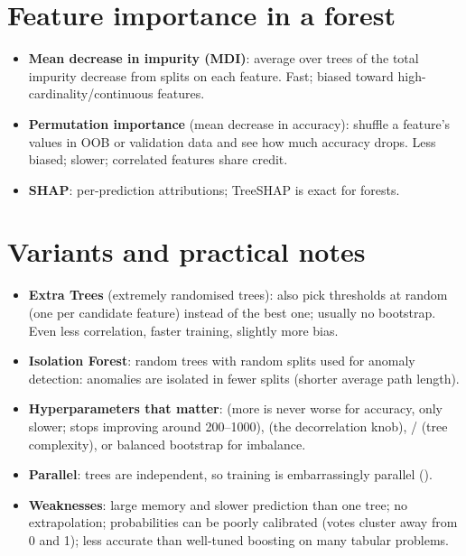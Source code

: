 \section{Feature importance in a forest}
\begin{itemize}
\item \textbf{Mean decrease in impurity (MDI)}: average over trees of the total impurity decrease from splits on each feature.
  Fast; biased toward high-cardinality/continuous features.
\item \textbf{Permutation importance} (mean decrease in accuracy): shuffle a feature's values in OOB or validation data and see how
  much accuracy drops. Less biased; slower; correlated features share credit.
\item \textbf{SHAP}: per-prediction attributions; TreeSHAP is exact for forests.
\end{itemize}

\section{Variants and practical notes}
\begin{itemize}
\item \textbf{Extra Trees} (extremely randomised trees): also pick thresholds at random (one per candidate feature) instead of
  the best one; usually no bootstrap. Even less correlation, faster training, slightly more bias.
\item \textbf{Isolation Forest}: random trees with random splits used for anomaly detection: anomalies are isolated in fewer splits
  (shorter average path length).
\item \textbf{Hyperparameters that matter}:  (more is never worse for accuracy, only slower; stops improving
  around 200--1000),  (the decorrelation knob), / (tree complexity),
   or balanced bootstrap for imbalance.
\item \textbf{Parallel}: trees are independent, so training is embarrassingly parallel ().
\item \textbf{Weaknesses}: large memory and slower prediction than one tree; no extrapolation; probabilities can be poorly
  calibrated (votes cluster away from 0 and 1); less accurate than well-tuned boosting on many tabular problems.
\end{itemize}


